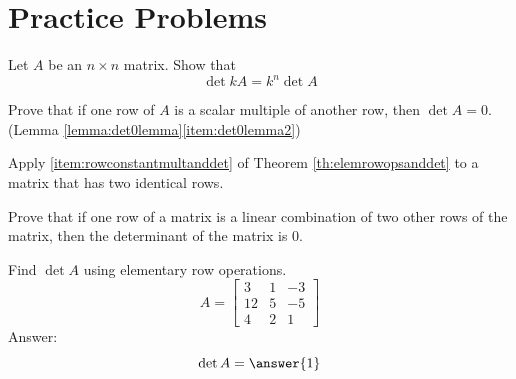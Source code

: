 \documentclass{ximera}
\begin{document}
\section*{Practice Problems}








\begin{problem}\label{prob:kAdet}
Let $A$ be an $n\times n$ matrix.  Show that 
$$\det{kA}=k^n\det{A}$$
\end{problem}

\begin{problem}\label{prob:proofdet0lemma2}
Prove that if one row of $A$ is a scalar multiple of another row, then $\det{A}=0$. (Lemma \ref{lemma:det0lemma}\ref{item:det0lemma2})
\begin{hint} 
Apply \ref{item:rowconstantmultanddet} of Theorem \ref{th:elemrowopsanddet} to a matrix that has two identical rows.
\end{hint}
\end{problem}


\begin{problem}\label{prob:onerowlincombanotherdet}
Prove that if one row of a matrix is a linear combination of two other rows of the matrix, then the determinant of the matrix is 0.
\end{problem}

\begin{problem}\label{prob:elemrowopsdet1}
Find $\det{A}$ using elementary row operations.
$$A=\begin{bmatrix}3&1&-3\\12&5&-5\\4&2&1\end{bmatrix}$$
Answer:
$$\det{A}=\answer{1}$$
\end{problem}
\end{document}

